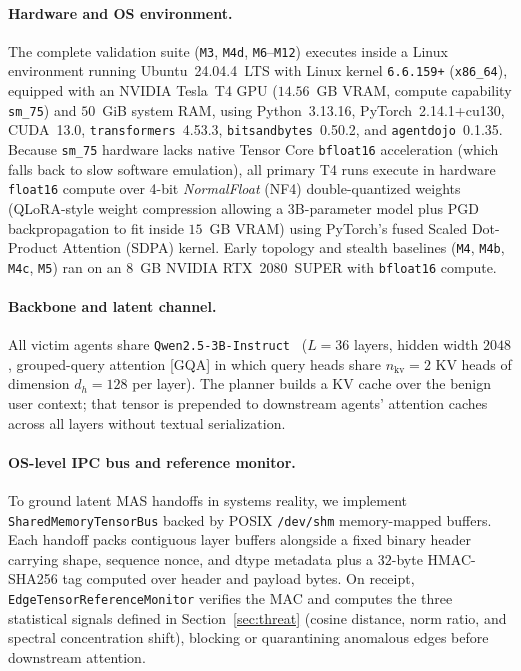 \documentclass{article}
\begin{document}
\paragraph{Hardware and OS environment.}
The complete validation suite (\texttt{M3}, \texttt{M4d}, \texttt{M6}--\texttt{M12})
executes inside a Linux environment running Ubuntu~24.04.4~LTS with Linux kernel
\texttt{6.6.159+} (\texttt{x86\_64}), equipped with an NVIDIA Tesla~T4 GPU
($14.56$~GB VRAM, compute capability \texttt{sm\_75}) and $50$~GiB system RAM,
using Python~3.13.16, PyTorch~2.14.1+cu130, CUDA~13.0, \texttt{transformers}~4.53.3,
\texttt{bitsandbytes}~0.50.2, and \texttt{agentdojo}~0.1.35. Because \texttt{sm\_75}
hardware lacks native Tensor Core \texttt{bfloat16} acceleration (which falls
back to slow software emulation), all primary T4 runs execute in hardware
\texttt{float16} compute over 4-bit \emph{NormalFloat} (NF4) double-quantized
weights~\citep{dettmers2023qlora} (QLoRA-style weight compression allowing a
3B-parameter model plus PGD backpropagation to fit inside $15$~GB VRAM) using
PyTorch's fused Scaled Dot-Product Attention (SDPA) kernel. Early topology and
stealth baselines (\texttt{M4}, \texttt{M4b}, \texttt{M4c}, \texttt{M5}) ran on
an $8$~GB NVIDIA RTX~2080~SUPER with \texttt{bfloat16} compute.

\paragraph{Backbone and latent channel.}
All victim agents share \texttt{Qwen2.5-3B-Instruct}~\citep{qwen25} ($L=36$
layers, hidden width $2048$, grouped-query attention [GQA] in which query heads
share $n_{\text{kv}}=2$ KV heads of dimension $d_h=128$ per layer). The planner
builds a KV cache over the benign user context; that tensor is prepended to
downstream agents' attention caches across all layers without textual
serialization.

\paragraph{OS-level IPC bus and reference monitor.}
To ground latent MAS handoffs in systems reality, we implement
\texttt{SharedMemoryTensorBus} backed by POSIX \texttt{/dev/shm} memory-mapped
buffers. Each handoff packs contiguous layer buffers alongside a fixed binary
header carrying shape, sequence nonce, and dtype metadata plus a $32$-byte
HMAC-SHA256 tag computed over header and payload bytes. On receipt,
\texttt{EdgeTensorReferenceMonitor} verifies the MAC and computes the three
statistical signals defined in Section~\ref{sec:threat} (cosine distance, norm
ratio, and spectral concentration shift), blocking or quarantining anomalous
edges before downstream attention.
\end{document}

